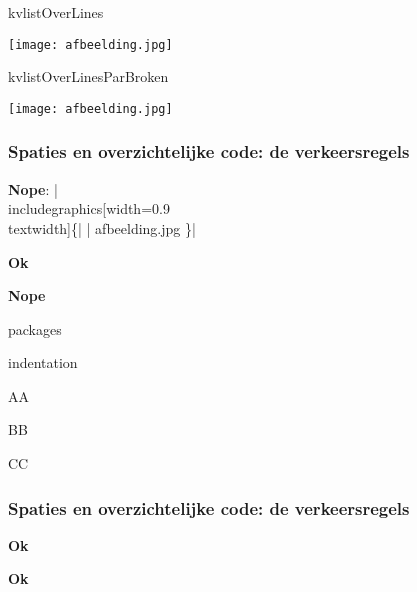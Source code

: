 

\begin{saveblock}{kvlistOverLines}
	\begin{highlightblock}
		\texttt{[image: afbeelding.jpg]}
	\end{highlightblock}
\end{saveblock}

\begin{saveblock}{kvlistOverLinesParBroken}
	\begin{highlightblock}
		\texttt{[image: afbeelding.jpg]}
	\end{highlightblock}
\end{saveblock}

\begin{frame}
	\frametitle{Spaties en overzichtelijke code: de verkeersregels}

	\textbf{\textcolor{darkpastelred}{Nope}}: \hll|\\includegraphics[width=0.9\\textwidth]\{| \hll| afbeelding.jpg \}|
	\medskip

	\textbf{\textcolor{darkpastelgreen}{Ok}}
	\medskip

	\textbf{\textcolor{darkpastelred}{Nope}}
\end{frame}

\begin{saveblock}{packages}
	\begin{highlightblock}
		\usepackage{
			parskip,
			hyperref
		}
	\end{highlightblock}
\end{saveblock}

\begin{saveblock}{indentation}
	\begin{highlightblock}
		\begin{center}
			AA
		\end{center}
		\begin{center}
		BB
		\end{center}
		\begin{center}CC\end{center}
	\end{highlightblock}
\end{saveblock}


\begin{frame}
	\frametitle{Spaties en overzichtelijke code: de verkeersregels}

	\textbf{\textcolor{darkpastelgreen}{Ok}}
	\medskip

	\textbf{\textcolor{darkpastelgreen}{Ok}}
\end{frame}
